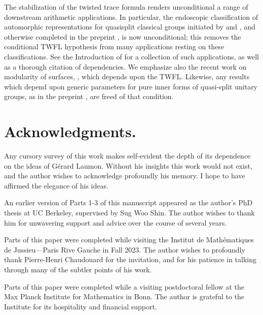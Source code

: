 \documentclass[openany]{amsbook}
\theoremstyle{definition}
\theoremstyle{remark}
\numberwithin{equation}{section}
\renewcommand{\-}{\operatorname{-}}
\begin{document}
The stabilization of the twisted trace formula renders unconditional a range of downstream arithmetic applications. In particular, the endoscopic classification of automorphic representations for quasisplit classical groups initiated by \cite{ArthurEndoscopic} and \cite{mokendclassunitary}, and otherwise completed in the preprint \cite{IntertwinersAPackets}, is now unconditional; this removes the conditional TWFL hypothesis from many applications resting on these classifications. See the Introduction of \cite{IntertwinersAPackets} for a collection of such applications, as well as a thorough citation of dependencies. We emphasize also the recent work on modularity of surfaces, \cite{boxeretalmodforsurfaces}, which depends upon the TWFL. Likewise, any results which depend upon generic parameters for pure inner forms of quasi-split unitary groups, as in the preprint \cite{kalethaswetalgenericparams}, are freed of that condition.















\section{Acknowledgments.}

Any cursory survey of this work makes self-evident the depth of its dependence on the ideas of G\'erard Laumon. Without his insights this work would not exist, and the author wishes to acknowledge profoundly his memory. I hope to have affirmed the elegance of his ideas. 

An earlier version of Parts 1-3 of this manuscript appeared as the author's PhD thesis at UC Berkeley, supervised by Sug Woo Shin. The author wishes to thank him for unwavering support and advice over the course of several years.

Parts of this paper were completed while visiting the Institut de Math\'{e}matiques de Jussieu---Paris Rive Gauche in Fall 2023. The author wishes to profoundly thank Pierre-Henri Chaudouard for the invitation, and for his patience in talking through many of the subtler points of his work.

Parts of this paper were completed while a visiting postdoctoral fellow at the Max Planck Institute for Mathematics in Bonn. The author is grateful to the Institute for its hospitality and financial support.
\end{document}

